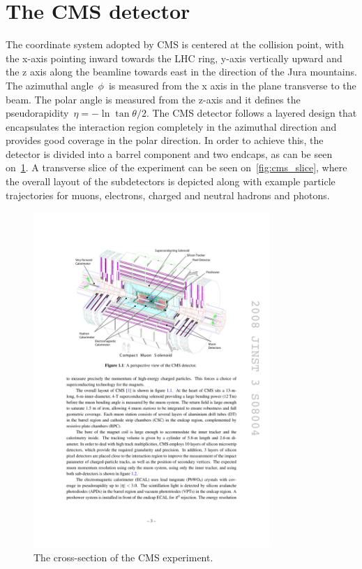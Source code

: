 \section{The CMS detector}
The coordinate system adopted by CMS is centered at the collision point, with the x-axis pointing inward towards the LHC ring, y-axis vertically upward and the z axis along the beamline towards east in the direction of the Jura mountains. The azimuthal angle~$\phi$~is measured from the x axis in the plane transverse to the beam. The polar angle is measured from the z-axis and it defines the pseudorapidity~$\eta = -\ln{\tan{\theta/2}}$. The CMS detector follows a layered design that encapsulates the interaction region completely in the azimuthal direction and provides good coverage in the polar direction. In order to achieve this, the detector is divided into a barrel component and two endcaps, as can be seen on~\cref{fig:cms_experiment}. A transverse slice of the experiment can be seen on~\cref{fig:cms_slice}, where the overall layout of the subdetectors is depicted along with example particle trajectories for muons, electrons, charged and neutral hadrons and photons. 

\begin{figure}
\begin{centering}
\includegraphics[width=0.8\textwidth]{figures/exp/cms.pdf}
\caption{The cross-section of the CMS experiment.}
\label{fig:cms_experiment}
\end{centering}
\end{figure}

